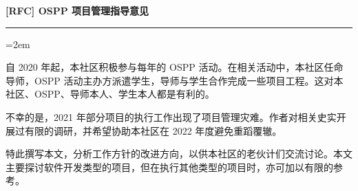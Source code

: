 \documentclass[a4paper,11pt]{article}
\begin{document}
\rmfamily







{\sffamily\huge\bfseries [RFC] OSPP 项目管理指导意见}
\vspace{12pt}

{\fontsize{10pt}{10pt}\selectfont\tableofcontents}

\vspace{2em}
\hrule
\vspace{1.5em}







\parindent=2em
\setdefaultleftmargin{2em}{1em}{1em}{1em}{1em}{1em}






自 2020 年起，本社区积极参与每年的 OSPP 活动。在相关活动中，本社区任命导师，OSPP 活动主办方派遣学生，导师与学生合作完成一些项目工程。这对本社区、OSPP、导师本人、学生本人都是有利的。

不幸的是，2021 年部分项目的执行工作出现了项目管理灾难。作者对相关史实开展过有限的调研，并希望协助本社区在 2022 年度避免重蹈覆辙。

特此撰写本文，分析工作方针的改进方向，以供本社区的老伙计们交流讨论。本文主要探讨软件开发类型的项目，但在执行其他类型的项目时，亦可加以有限的参考。
\end{document}

